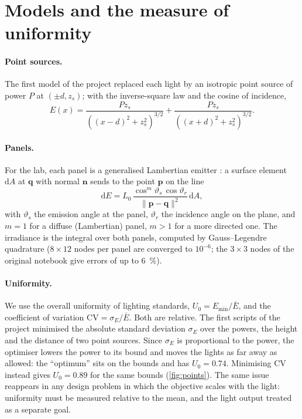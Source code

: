 \documentclass[11pt,a4paper]{article}
\begin{document}
\section{Models and the measure of uniformity}

\paragraph{Point sources.} The first model of the project replaced each light by an isotropic point source of power
$P$ at $(\pm d, z_s)$; with the inverse-square law and the cosine of incidence,
\begin{equation}
  E(x) = \frac{P z_s}{\left((x-d)^2 + z_s^2\right)^{3/2}} + \frac{P z_s}{\left((x+d)^2 + z_s^2\right)^{3/2}}.
\end{equation}

\paragraph{Panels.} For the lab, each panel is a generalised Lambertian emitter \citep{Moreno2008}: a surface element
$\mathrm dA$ at $\mathbf q$ with normal $\mathbf n$ sends to the point $\mathbf p$ on the line
\begin{equation}
  \mathrm dE = L_0 \, \frac{\cos^m\vartheta_s \, \cos\vartheta_r}{\lVert \mathbf p - \mathbf q\rVert^2}\, \mathrm dA,
\end{equation}
with $\vartheta_s$ the emission angle at the panel, $\vartheta_r$ the incidence angle on the plane, and $m = 1$ for a
diffuse (Lambertian) panel, $m > 1$ for a more directed one. The irradiance is the integral over both panels,
computed by Gauss--Legendre quadrature ($8 \times 12$ nodes per panel are converged to $10^{-6}$; the $3 \times 3$
nodes of the original notebook give errors of up to \SI{6}{\percent}).

\paragraph{Uniformity.} We use the overall uniformity of lighting standards, $U_0 = E_{\min}/\bar E$, and the
coefficient of variation $\mathrm{CV} = \sigma_E / \bar E$. Both are relative. The first scripts of the project
minimised the absolute standard deviation $\sigma_E$ over the powers, the height and the distance of two point
sources. Since $\sigma_E$ is proportional to the power, the optimiser lowers the power to its bound and moves the
lights as far away as allowed: the ``optimum'' sits on the bounds and has $U_0 = 0.74$. Minimising CV instead gives
$U_0 = 0.89$ for the same bounds (\cref{fig:points}). The same issue reappears in any design problem in which the
objective scales with the light: uniformity must be measured relative to the mean, and the light output treated as
a separate goal.
\end{document}
